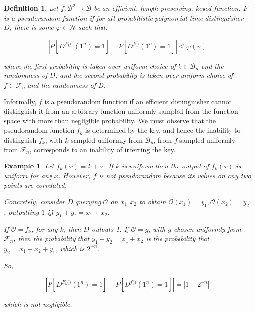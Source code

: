\documentclass[a4paper, 12pt]{article}
\newtheorem{example}{Example}
\newtheorem{example}{Example} \newtheorem{definition}{Definition}
\begin{document}
\begin{definition}
    Let $f : \mathcal{B}^2 \to \mathcal{B}$ be an efficient, length 
    preserving, keyed function. $F$ is a pseudorandom 
    function if for all probabilistic polynomial-time distinguisher 
    $D$, there is some $\varphi \in \mathcal{N}$ such that: 

    \begin{equation*}
        \left|   P\left[ D^{F_k(\dot)}(1^n) = 1 \right] - P \left[ D^{f(\dot)}(1^n) = 1 \right]     \right| \leq \varphi(n)
    \end{equation*}

    where the first probability is taken over uniform choice of $k \in \mathcal{B}_n$ 
    and the randomness of $D$, and the second probability is taken over uniform 
    choice of $f \in \mathcal{F}_n$ and the randomness of $D$.
\end{definition}

Informally, $f$ is a pseudorandom function if an efficient distinguisher cannot
distinguish it from an arbitrary function uniformly sampled from the function
space with more than negligible probability. We must observe that the pseudorandom 
function $f_k$ is determined by the key, and hence the inability to distinguish $f_k$,
with $k$ sampled uniformly from $\mathcal{B}_n$, from $f$ sampled uniformly from 
$\mathcal{F}_n$, corresponds to an inability of inferring the key.

\begin{example}
    Let $f_k(x) = k + x$. If $k$ is uniform then the output of $f_k(x)$ is uniform 
    for any $x$. However, $f$ is not pseudorandom because its values on any two 
    points are correlated. 

    Concretely, consider $D$ querying $\mathcal{O}$ on $x_1, x_2$ to obtain 
    $\mathcal{O}(x_1) = y_1, \mathcal{O}(x_2) = y_2$, outputting $1$
    iff $y_1 + y_2 = x_1 + x_2$.

    If $\mathcal{O} = f_k$, for any $k$, then $D$ outputs 1. If $\mathcal{O} = g$,
    with $g$ chosen uniformly from $\mathcal{F}_n$, then the probability 
    that $y_1 + y_2 = x_1 + x_2$ is the probability that 
    $y_2 = x_1 + x_2 + y_1$, which is $2^{-n}$. 

    So, 

    \begin{equation*}
        \left|   P\left[ D^{F_k(\dot)}(1^n) = 1 \right] - P \left[ D^{f(\dot)}(1^n) = 1 \right]     \right| = \left| 1 - 2^{-n} \right| 
    \end{equation*}

    which is not negligible.
\end{example}
\end{document}
